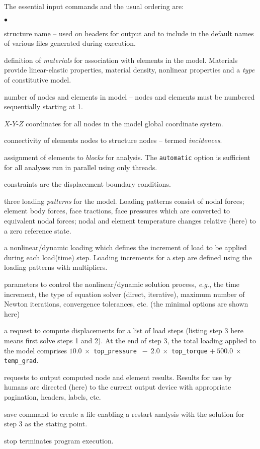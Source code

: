 \documentclass[11pt]{report}
\numberwithin{equation}{section}
\newcommand{\ttt} {\texttt}  %
\newcommand{\eg}{\emph{e.g.},\xspace}
\newcommand{\ti}{\emph}
\newcommand{\nid}{\noindent}
\newcommand{\squishlist}{
 \begin{list}{$\bullet$}
  { \setlength{\itemsep}{0pt}
     \setlength{\parsep}{3pt}
     \setlength{\topsep}{3pt}
     \setlength{\partopsep}{0pt}
     \setlength{\leftmargin}{1.5em}
     \setlength{\labelwidth}{1em}
     \setlength{\labelsep}{0.5em} } }
\newcommand{\squishend}{
  \end{list}  }
\begin{document}
{\nid The essential input commands and the usual ordering are:
\small
\squishlist
\item	structure name -- used on headers for output and to include in the default
names of various files  generated during execution.
\item definition of  \ti{materials} for association with elements in the model. 
Materials provide linear-elastic properties, material density, 
nonlinear properties and a \ti{type} of constitutive model.
\item number of nodes and elements in model -- nodes and elements
must be numbered sequentially starting at 1.
\item	$X\mbox{-}Y\mbox{-}Z$ coordinates for all nodes in the model 
global coordinate system.
\item	connectivity of elements nodes to structure nodes -- termed 
\ti{incidences}.
\item assignment of  elements to \ti{blocks} for analysis. The \ttt{automatic} option is
 sufficient for all analyses run in parallel using only threads.
\item constraints are the displacement boundary conditions.
\item three  loading \ti{patterns} for the model. Loading patterns consist of nodal forces; 
element body forces, face tractions, face pressures which are converted to 
equivalent nodal forces; nodal and element temperature changes relative (here)
to a zero reference state.
\item a nonlinear/dynamic loading which defines the increment of load to 
be applied during each load(time) step. Loading increments for a step are 
defined using the loading patterns with multipliers.
\item parameters to control the nonlinear/dynamic solution process, \eg 
the time increment, the type of equation solver 
(direct, iterative), maximum number of Newton iterations, 
convergence tolerances, etc. (the minimal options are shown here)
\item a request to compute displacements for a list of load steps (listing step 3 here
means first solve steps 1 and 2). At the end of step 3, the total loading
applied to the model 
comprises $10.0\ \times$ \ttt{top\_pressure} $\ -\ 2.0\ \times$ \ttt{top\_torque} 
$ +\ 500.0\ \times $\ttt{temp\_grad}.
\item requests to output computed node and element results. Results 
for use by humans are directed (here) to the current output device with 
appropriate pagination, headers, labels, etc.
\item save command to create a file enabling a restart analysis with the
solution for step 3 as the stating point. 
\item	 stop terminates program execution.
\squishend
\normalsize

}
\end{document}
